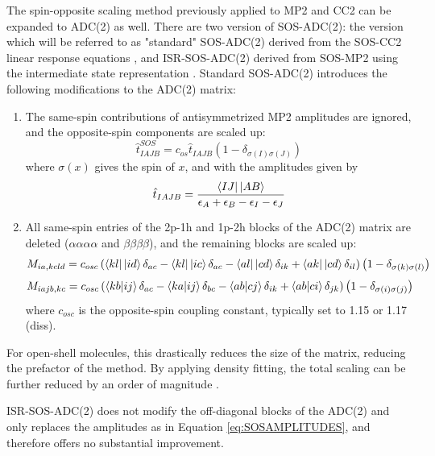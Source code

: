 The spin-opposite scaling method previously applied to MP2 and CC2 can be expanded to ADC(2) as well.    There are two version of SOS-ADC(2): the version which will be referred to as "standard" SOS-ADC(2) derived from the SOS-CC2 linear response equations \cite{Win2011}, and ISR-SOS-ADC(2) derived from SOS-MP2 using the intermediate state representation \cite{Kra2013}. Standard SOS-ADC(2) introduces the following modifications to the ADC(2) matrix:
\begin{enumerate}
\item The same-spin contributions of antisymmetrized MP2 amplitudes are ignored, and the opposite-spin components are scaled up:
\begin{equation}
\hat{t}_{IAJB}^{SOS} = c_{os} \hat{t}_{IAJB} \left( 1 - \delta _{\sigma (I) \sigma (J)} \right)
\label{eq:SOSAMPLITUDES}
\end{equation}
where $\sigma (x)$ gives the spin of $x$, and with the amplitudes given by
\begin{equation}
\hat{t}_{IAJB} = \frac{\bra{IJ}{}\ket{AB}}{\epsilon_A + \epsilon_B - \epsilon_I - \epsilon_J}
\end{equation}
\item All same-spin entries of the 2p-1h and 1p-2h blocks of the ADC(2) matrix are deleted ($\alpha\alpha\alpha\alpha$ and $\beta\beta\beta\beta$), and the  remaining blocks are scaled up:
\begin{equation}
M_{ia,kcld} = c_{osc} \left( \bra{kl}{}\ket{id} \delta_{ac} - \bra{kl}{}\ket{ic} \delta_{ac} - \bra{al}{}\ket{cd} \delta_{ik} + \bra{ak}{}\ket{cd} \delta_{il} \right) \left( 1 - \delta_{\sigma (k) \sigma (l)} \right)
\end{equation}
\begin{equation}
M_{iajb,kc} = c_{osc} \left( \bra{kb} \ket{ij} \delta_{ac} - \bra{ka} \ket{ij} \delta_{bc} - \bra{ab} \ket{cj} \delta_{ik} + \bra{ab} \ket{ci} \delta_{jk} \right) \left( 1 - \delta_{\sigma (i) \sigma (j)} \right)
\end{equation}
\noindent where $c_{osc}$ is the opposite-spin coupling constant, typically set to 1.15 \cite{Kra2013} or 1.17 (diss).
\end{enumerate}

\noindent For open-shell molecules, this drastically reduces the size of the matrix, reducing the prefactor of the method. By applying density fitting, the total scaling can be further reduced by an order of magnitude \cite{Win2011}.

ISR-SOS-ADC(2) does not modify the off-diagonal blocks of the ADC(2) and only replaces the amplitudes as in Equation \ref{eq:SOSAMPLITUDES}, and therefore offers no substantial improvement. 

